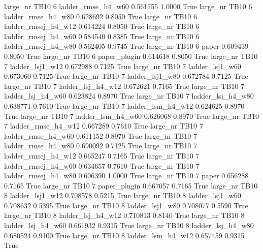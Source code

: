  large_nr     TB10                 6  ladder_rmse_h4_w60   0.561755      1.0000    True
  large_nr     TB10                 6  ladder_rmse_h4_w80   0.628692      0.8050    True
  large_nr     TB10                 6 ladder_rmsej_h4_w12   0.614224      0.8050    True
  large_nr     TB10                 6 ladder_rmsej_h4_w60   0.584540      0.8385    True
  large_nr     TB10                 6 ladder_rmsej_h4_w80   0.562405      0.9745    True
  large_nr     TB10                 6               paper   0.609439      0.8050    True
  large_nr     TB10                 6        paper_plugin   0.614618      0.8050    True
  large_nr     TB10                 7     ladder_lsj1_w12   0.672988      0.7125    True
  large_nr     TB10                 7     ladder_lsj1_w60   0.673060      0.7125    True
  large_nr     TB10                 7     ladder_lsj1_w80   0.672784      0.7125    True
  large_nr     TB10                 7   ladder_lsj_h4_w12   0.672621      0.7165    True
  large_nr     TB10                 7   ladder_lsj_h4_w60   0.623824      0.8970    True
  large_nr     TB10                 7   ladder_lsj_h4_w80   0.638771      0.7610    True
  large_nr     TB10                 7   ladder_lsm_h4_w12   0.624625      0.8970    True
  large_nr     TB10                 7   ladder_lsm_h4_w60   0.626068      0.8970    True
  large_nr     TB10                 7  ladder_rmse_h4_w12   0.667289      0.7610    True
  large_nr     TB10                 7  ladder_rmse_h4_w60   0.611152      0.8970    True
  large_nr     TB10                 7  ladder_rmse_h4_w80   0.690092      0.7125    True
  large_nr     TB10                 7 ladder_rmsej_h4_w12   0.665247      0.7165    True
  large_nr     TB10                 7 ladder_rmsej_h4_w60   0.634657      0.7610    True
  large_nr     TB10                 7 ladder_rmsej_h4_w80   0.606390      1.0000    True
  large_nr     TB10                 7               paper   0.656288      0.7165    True
  large_nr     TB10                 7        paper_plugin   0.667057      0.7165    True
  large_nr     TB10                 8     ladder_lsj1_w12   0.708578      0.5215    True
  large_nr     TB10                 8     ladder_lsj1_w60   0.708632      0.5395    True
  large_nr     TB10                 8     ladder_lsj1_w80   0.708077      0.5590    True
  large_nr     TB10                 8   ladder_lsj_h4_w12   0.710813      0.8140    True
  large_nr     TB10                 8   ladder_lsj_h4_w60   0.661932      0.9315    True
  large_nr     TB10                 8   ladder_lsj_h4_w80   0.680524      0.9100    True
  large_nr     TB10                 8   ladder_lsm_h4_w12   0.657459      0.9315    True
